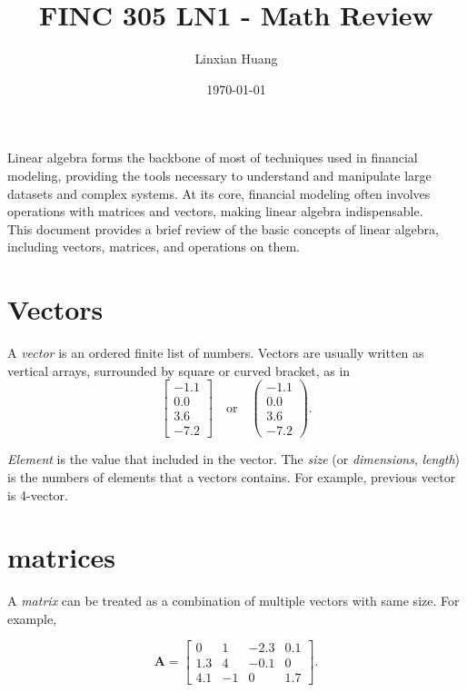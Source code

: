 \documentclass[11pt]{article}
\title{FINC 305 LN1 - Math Review}
\author{Linxian Huang}
\date{\today}
\begin{document}
\maketitle
    Linear algebra forms the backbone of most of  techniques used in financial modeling, providing the tools necessary to understand 
    and manipulate large datasets and complex systems. At its core, financial modeling often involves operations with matrices and vectors,
     making linear algebra indispensable. \\

    This document provides a brief review of the basic concepts of linear algebra, including vectors, matrices, and operations on them.


\section{Vectors}

A \textit{vector} is an ordered finite list of numbers. Vectors are usually written as vertical arrays, surrounded by square or curved bracket, 
as in \\

\[
\begin{bmatrix}
-1.1 \\ 
0.0 \\ 
3.6 \\ 
-7.2
\end{bmatrix}
\quad \text{or} \quad
\begin{pmatrix}
-1.1 \\ 
0.0 \\ 
3.6 \\ 
-7.2
\end{pmatrix}.
\]

\textit{Element} is the value that included in the vector. The \textit{size} (or \textit{dimensions}, \textit{length}) is the numbers of elements 
that a vectors contains. For example, previous vector is 4-vector. 


\section{matrices}

A \textit{matrix} can be treated as a combination of multiple vectors with same size. For example, 

\[
\mathbf{A} =
\begin{bmatrix}
0 & 1 & -2.3 & 0.1 \\
1.3 & 4 & -0.1 & 0 \\
4.1 & -1 & 0 & 1.7
\end{bmatrix}.
\]
\end{document}
